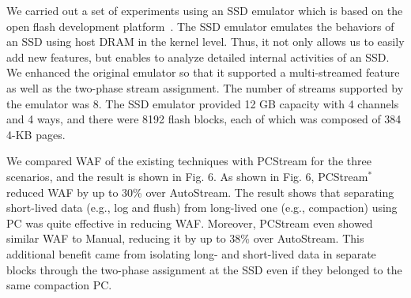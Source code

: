 We carried out a set of experiments using an SSD emulator which is based on the
open flash development platform~\cite{AMF}.  The SSD emulator emulates the
behaviors of an SSD using host DRAM in the kernel level. Thus, it not only
allows us to easily add new features, but enables to analyze detailed internal
activities of an SSD.  We enhanced the original emulator so that it supported a
multi-streamed feature as well as the two-phase stream assignment.  The number
of streams supported by the emulator was 8.  The SSD emulator provided 12 GB
capacity with 4 channels and 4 ways, and there were 8192 flash blocks, each of
which was composed of 384 4-KB pages.  

We compared WAF of the existing techniques with {\sf PCStream} for the three
scenarios, and the result is shown in Fig. 6.  As shown in
Fig. 6, {\sf PCStream$^*$} reduced WAF by up to 30\% over
\textsf{AutoStream}.  The result shows that separating short-lived data (e.g.,
log and flush) from long-lived one (e.g., compaction) using PC was quite
effective in reducing WAF.  Moreover, {\sf PCStream} even showed similar WAF to
\textsf{Manual}, reducing it by up to 38\% over \textsf{AutoStream}.  This
additional benefit came from isolating long- and short-lived data in separate
blocks through the two-phase assignment at the SSD even if they belonged to the
same compaction PC.

